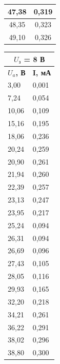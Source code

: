 \documentclass[a4paper,12pt]{article}
\begin{document}
\begin{table}[h]
\begin{minipage}{0.3\textwidth}
\begin{tabular}{|cc|}
\multicolumn{1}{|c|}{47,38} & 0,319 \\ \hline
\multicolumn{1}{|c|}{48,35} & 0,323 \\ \hline
\multicolumn{1}{|c|}{49,10} & 0,326 \\ \hline
\end{tabular}
\end{minipage}
\begin{minipage}{0.3\textwidth}
\begin{tabular}{|ll|}
\hline
\multicolumn{2}{|c|}{\textbf{$U_з$ = 8 В}} \\ \hline
\multicolumn{1}{|c|}{\textbf{$U_a$, В}} & \multicolumn{1}{c|}{\textbf{I, мА}} \\ \hline
\multicolumn{1}{|l|}{3,00} & 0,001 \\ \hline
\multicolumn{1}{|l|}{7,24} & 0,054 \\ \hline
\multicolumn{1}{|l|}{10,06} & 0,109 \\ \hline
\multicolumn{1}{|l|}{15,16} & 0,195 \\ \hline
\multicolumn{1}{|l|}{18,06} & 0,236 \\ \hline
\multicolumn{1}{|l|}{20,24} & 0,259 \\ \hline
\multicolumn{1}{|l|}{20,90} & 0,261 \\ \hline
\multicolumn{1}{|l|}{21,94} & 0,260 \\ \hline
\multicolumn{1}{|l|}{22,39} & 0,257 \\ \hline
\multicolumn{1}{|l|}{23,13} & 0,247 \\ \hline
\multicolumn{1}{|l|}{23,95} & 0,217 \\ \hline
\multicolumn{1}{|l|}{25,24} & 0,094 \\ \hline
\multicolumn{1}{|l|}{26,31} & 0,094 \\ \hline
\multicolumn{1}{|l|}{26,69} & 0,096 \\ \hline
\multicolumn{1}{|l|}{27,43} & 0,105 \\ \hline
\multicolumn{1}{|l|}{28,05} & 0,116 \\ \hline
\multicolumn{1}{|l|}{29,93} & 0,165 \\ \hline
\multicolumn{1}{|l|}{32,20} & 0,218 \\ \hline
\multicolumn{1}{|l|}{34,21} & 0,261 \\ \hline
\multicolumn{1}{|l|}{36,22} & 0,291 \\ \hline
\multicolumn{1}{|l|}{38,02} & 0,296 \\ \hline
\multicolumn{1}{|l|}{38,80} & 0,300 \\ \hline

\end{tabular}
\end{minipage}
\end{table}
\end{document}
